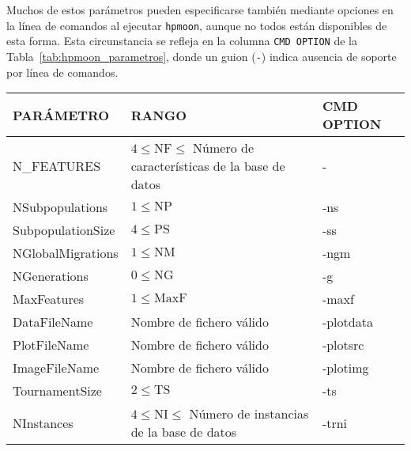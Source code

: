 Muchos de estos parámetros pueden especificarse también mediante opciones en la línea de comandos al ejecutar \texttt{hpmoon}, aunque no todos están disponibles de esta forma. Esta circunstancia se refleja en la columna \texttt{CMD OPTION} de la Tabla~\ref{tab:hpmoon_parametros}, donde un guion (\texttt{-}) indica ausencia de soporte por línea de comandos.
\begin{table}[htbp]
    \centering
    \footnotesize
    \setlength{\tabcolsep}{3pt}
    \begin{tabular}{|p{3cm}|p{6cm}|p{2.2cm}|}
        \hline
        \textbf{PARÁMETRO}  & \textbf{RANGO}                                                          & \textbf{CMD OPTION} \\ \hline
        N\_FEATURES         & $4 \leq \mathrm{NF} \leq$ Número de características de la base de datos & -                   \\ \hline
        NSubpopulations     & $1 \leq \mathrm{NP}$                                                    & -ns                 \\ \hline
        SubpopulationSize   & $4 \leq \mathrm{PS}$                                                    & -ss                 \\ \hline
        NGlobalMigrations   & $1 \leq \mathrm{NM}$                                                    & -ngm                \\ \hline
        NGenerations        & $0 \leq \mathrm{NG}$                                                    & -g                  \\ \hline
        MaxFeatures         & $1 \leq \mathrm{MaxF}$                                                  & -maxf               \\ \hline
        DataFileName        & Nombre de fichero válido                                                & -plotdata           \\ \hline
        PlotFileName        & Nombre de fichero válido                                                & -plotsrc            \\ \hline
        ImageFileName       & Nombre de fichero válido                                                & -plotimg            \\ \hline
        TournamentSize      & $2 \leq \mathrm{TS}$                                                    & -ts                 \\ \hline
        NInstances          & $4 \leq \mathrm{NI} \leq$ Número de instancias de la base de datos      & -trni               \\ \hline

\end{tabular}
\end{table}
